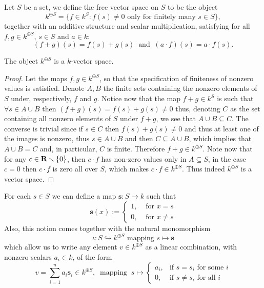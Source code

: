\begin{definition}\label{def: free vector space}
   Let \(S\) be a set, we define the free vector space on \(S\) to be the object
   \[
      k^{\oplus S} = \{f \in k^S : f(s) \neq 0 \text{ only for finitely many }
      s \in S\},
   \]
   together with an additive structure and scalar multiplication, satisfying for
   all \(f, g \in k^{\oplus S}\), \(s \in S\) and \(a \in k\):
   \[
      (f + g)(s) = f(s) + g(s)\ \text{ and }\ (a \cdot f)(s) = a \cdot f(s).
   \]
\end{definition}

\begin{proposition}
   The object \(k^{\oplus S}\) is a \(k\)-vector space.
\end{proposition}

\begin{proof}
   Let the maps \(f, g \in k^{\oplus S}\), so that the specification of
   finiteness of nonzero values is satisfied. Denote \(A, B\) the finite sets
   containing the nonzero elements of \(S\) under, respectively, \(f\) and
   \(g\). Notice now that the map \(f + g \in k^S\) is such that \(\forall s \in
   A \cup B\) then \((f+g)(s) = f(s)+g(s) \neq  0\) thus, denoting \(C\) as the
   set containing all nonzero elements of \(S\) under \(f + g\), we see that \(A
   \cup B \subseteq C\). The converse is trivial since if \(s \in C\) then
   \(f(s) + g(s) \neq 0\) and thus at least one of the images is nonzero, thus
   \(s \in A \cup B\) and then \(C \subseteq  A \cup B\), which implies that \(A
   \cup B = C\) and, in particular, \(C\) is finite. Therefore \(f + g \in
   k^{\oplus S}\). Note now that for any \(c \in \mathbf{R} \smallsetminus \{0\}\),
   then \(c \cdot f\) has non-zero values only in \(A \subseteq S\), in the case
   \(c = 0\) then  \(c \cdot f\) is zero all over \(S\), which makes \(c \cdot f
   \in k^{\oplus S}\). Thus indeed \(k^{\oplus S}\) is a vector space.
\end{proof}

For each \(s \in S\) we can define a map \(\mathbf{s} : S \to k\) such that
\[
   \mathbf{s}(x) :=
   \begin{cases}
      1, &\text{ for } x = s\\
      0, &\text{ for } x \neq s
   \end{cases}
\]
Also, this notion comes together with the natural monomorphism
\[
   \iota : S \hookrightarrow k^{\oplus S} \text{ mapping } s \mapsto \mathbf{s}
\]
which allow us to write any element \(v \in k^{\oplus S}\) as a linear
combination, with nonzero scalars \(a_i \in k\), of the form
\[
   v = \sum_{i=1}^n a_i \mathbf{s}_i \in k^{\oplus S},\
   \text{ mapping }\ s \mapsto
   \begin{cases}
      a_i, &\text{if } s = s_i \text{ for some } i \\
      0, &\text{if } s \neq s_i \text{ for all } i
   \end{cases}
\]

